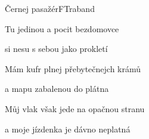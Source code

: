 \begin{song}{Černej pasažér}{F}{Traband}
\begin{SBVerse}
Tu jedinou a pocit bezdomovce

si nesu s sebou jako prokletí

\end{SBVerse}

\begin{SBChorus}

\end{SBChorus}

\begin{SBVerse}

Mám kufr plnej přebytečnejch krámů

a mapu zabalenou do plátna

Můj vlak však jede na opačnou stranu

a moje jízdenka je dávno neplatná 

\end{SBVerse}
\begin{SBChorus}

\end{SBChorus}
\end{song}

\clearpage
